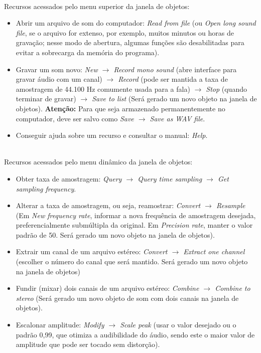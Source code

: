 \documentclass[portuguese]{textolivre}
\begin{document}
\hfill \break
\\Recursos acessados pelo menu superior da janela de objetos:
\begin{itemize}
\item Abrir um arquivo de som do computador: \textit{Read from file} (ou \textit{Open long sound file}, se o arquivo for extenso, por exemplo, muitos minutos ou horas de gravação; nesse modo de abertura, algumas funções são desabilitadas para evitar a sobrecarga da memória do programa). 
\item Gravar um som novo: \textit{New $\rightarrow$ Record mono sound} (abre interface para gravar áudio com um canal) \textit{$\rightarrow$ Record} (pode ser mantida a taxa de amostragem de 44.100 Hz comumente usada para a fala) \textit{$\rightarrow$ Stop} (quando terminar de gravar) \textit{$\rightarrow$ Save to list} (Será gerado um novo objeto na janela de objetos). \textbf{Atenção:} Para que seja armazenado permanentemente no computador, deve ser salvo como \textit{Save $\rightarrow$ Save as WAV file}.
\item Conseguir ajuda sobre um recurso e consultar o manual: \textit{Help}.
\end{itemize}

\hfill \break
\\Recursos acessados pelo menu dinâmico da janela de objetos:
\begin{itemize}
\item Obter taxa de amostragem: \textit{Query $\rightarrow$ Query time sampling $\rightarrow$ Get sampling frequency}.
\item Alterar a taxa de amostragem, ou seja, reamostrar: \textit{Convert $\rightarrow$ Resample} (Em \textit{New frequency rate}, informar a nova frequência de amostragem desejada, preferencialmente submúltipla da original. Em \textit{Precision rate}, manter o valor padrão de 50. Será gerado um novo objeto na janela de objetos).
\item Extrair um canal de um arquivo estéreo: \textit{Convert $\rightarrow$ Extract one channel} (escolher o número do canal que será mantido. Será gerado um novo objeto na janela de objetos)
\item Fundir (mixar) dois canais de um arquivo estéreo: \textit{Combine $\rightarrow$ Combine to stereo} (Será gerado um novo objeto de som com dois canais na janela de objetos).
\item Escalonar amplitude: \textit{Modify $\rightarrow$ Scale peak} (usar o valor desejado ou o padrão 0,99, que otimiza a audibilidade do áudio, sendo este o maior valor de amplitude que pode ser tocado sem distorção).
\end{itemize}
\end{document}
